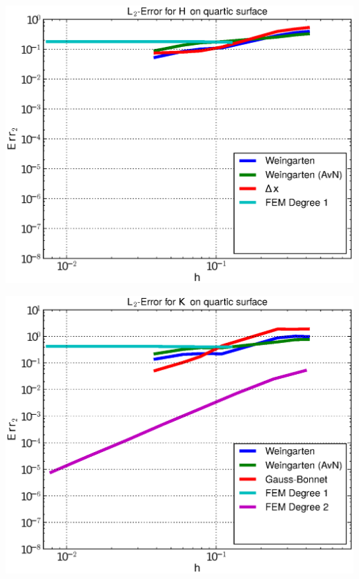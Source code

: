 \documentclass[handout]{beamer}
\begin{document}
\begin{frame}
\begin{overprint}
\begin{minipage}[t]{0.49\textwidth}
            \centering\includegraphics[width=\textwidth]{bilder/Curvature/heineB/ErrHL2_4.eps}
          \end{minipage}
          \begin{minipage}[t]{0.49\textwidth}
            \centering\includegraphics[width=\textwidth]{bilder/Curvature/heineB/ErrKL2_5.eps}
          \end{minipage}\hfill
          \begin{minipage}[t]{0.49\textwidth}

\end{minipage}
\end{overprint}
\end{frame}
\end{document}
